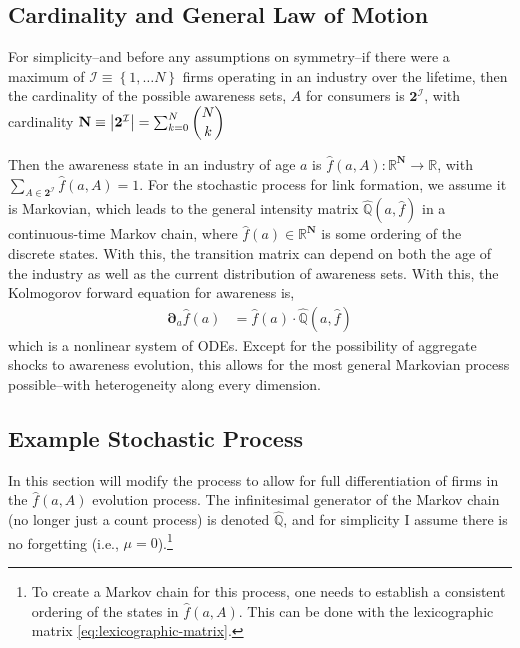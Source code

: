 \documentclass[12pt]{article}
\newcommand{\set}[1]{\ensuremath{\left\{{#1}\right\}}}
\newcommand{\R}{\ensuremath{\mathbb{R}}}
\newcommand{\Q}[0]{\ensuremath{\mathbb{Q}}}
\newcommand{\D}[1][]{\ensuremath{\boldsymbol{\partial}_{#1}}}
\newcommand{\abs}[1]{\ensuremath{\left| {#1}\right|}}
\begin{document}
\subsection{Cardinality and General Law of Motion}
For simplicity--and before any assumptions on symmetry--if there were a maximum of $\mathcal{I} \equiv \set{1,\ldots N}$ firms operating in an industry over the lifetime, then the cardinality of the possible awareness sets, $A$ for consumers is $\mathbf{2}^{\mathcal{I}}$, with cardinality $\mathbf{N} \equiv \abs{\mathbf{2}^{\mathcal{I}}} = \sum_{k=0}^{N} \dbinom{N}{k}$

Then the awareness state in an industry of age $a$ is $\hat{f}(a, A) : \R^{\mathbf{N}} \to \R$, with $\sum\limits_{A \in \mathbf{2}^{\mathcal{I}}}\hat{f}(a, A) = 1$.  For the stochastic process for link formation, we assume it is Markovian, which leads to the general intensity matrix $\hat{\Q}(a,\hat{f})$ in a continuous-time Markov chain, where $\hat{f}(a) \in \R^{\mathbf{N}}$ is some ordering of the discrete states.  With this, the transition matrix can depend on both the age of the industry as well as the current distribution of awareness sets.  With this, the Kolmogorov forward equation for awareness is,
\begin{align}
	\D[a] \hat{f}(a) &= \hat{f}(a)\cdot\hat{\Q}(a,\hat{f})\label{eq:differentiated-LOM-nonlinear}
\end{align}
which is a nonlinear system of ODEs.  Except for the possibility of aggregate shocks to awareness evolution, this allows for the most general Markovian process possible--with heterogeneity along every dimension.

\subsection{Example Stochastic Process}\label{sec:fully-differentiated-example}

In this section will modify the process to allow for full differentiation of firms in the $\hat{f}(a,A)$ evolution process.  The infinitesimal generator of the Markov chain (no longer just a count process) is denoted $\hat{\Q}$, and for simplicity I assume there is no forgetting (i.e., $\mu = 0$).\footnote{  To create a Markov chain for this process, one needs to establish a consistent ordering of the states in $\hat{f}(a, A)$.  This can be done with the lexicographic matrix \cref{eq:lexicographic-matrix}.}
\end{document}
